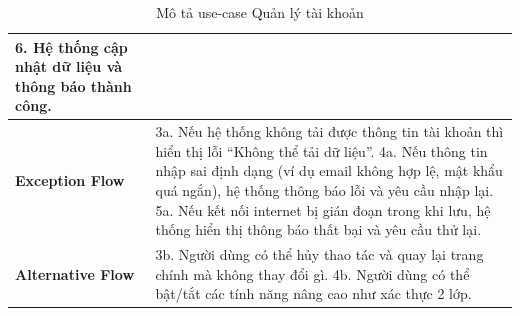 \documentclass[a4paper]{article}
\begin{document}
\begin{table}[H]
\begin{tabularx}{\textwidth}{|l|X|}
		6. Hệ thống cập nhật dữ liệu và thông báo thành công.                                                                                                                            \\ \hline
		\textbf{Exception Flow}
		                       & 3a. Nếu hệ thống không tải được thông tin tài khoản thì hiển thị lỗi “Không thể tải dữ liệu”. \newline
		4a. Nếu thông tin nhập sai định dạng (ví dụ email không hợp lệ, mật khẩu quá ngắn), hệ thống thông báo lỗi và yêu cầu nhập lại. \newline
		5a. Nếu kết nối internet bị gián đoạn trong khi lưu, hệ thống hiển thị thông báo thất bại và yêu cầu thử lại.                                                                    \\ \hline
		\textbf{Alternative Flow}
		                       & 3b. Người dùng có thể hủy thao tác và quay lại trang chính mà không thay đổi gì. \newline
		4b. Người dùng có thể bật/tắt các tính năng nâng cao như xác thực 2 lớp.                                                                                                         \\ \hline
	\end{tabularx}
	\caption{Mô tả use-case Quản lý tài khoản}
\end{table}

\end{document}
